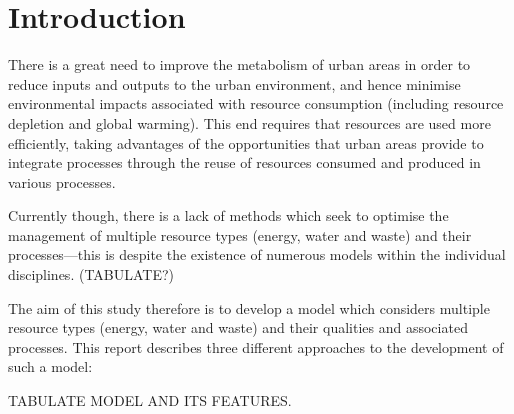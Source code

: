 \section{Introduction}
There is a great need to improve the metabolism of urban areas in order to reduce inputs and outputs to the urban environment, and hence minimise environmental impacts associated with resource consumption (including resource depletion and global warming). This end requires that resources are used more efficiently, taking advantages of the opportunities that urban areas provide to integrate processes through the reuse of resources consumed and produced in various processes.

Currently though, there is a lack of methods which seek to optimise the management of multiple resource types (energy, water and waste) and their processes---this is despite the existence of numerous models within the individual disciplines. (TABULATE?)

The aim of this study therefore is to develop a model which considers multiple resource types (energy, water and waste) and their qualities and associated processes. This report describes three different approaches to the development of such a model:

TABULATE MODEL AND ITS FEATURES.

